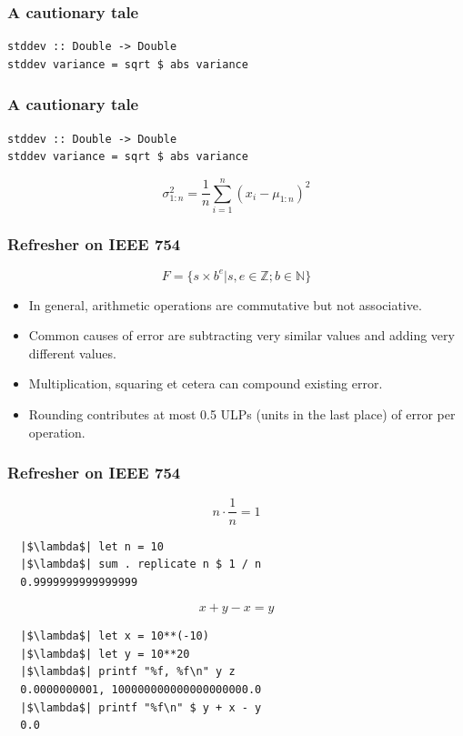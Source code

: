 \documentclass{beamer}
\begin{document}
\begin{frame}[fragile]
\frametitle{A cautionary tale}

\begin{verbatim}
stddev :: Double -> Double
stddev variance = sqrt $ abs variance
\end{verbatim}

\end{frame}

\begin{frame}[fragile]
\frametitle{A cautionary tale}

\begin{verbatim}
stddev :: Double -> Double
stddev variance = sqrt $ abs variance
\end{verbatim}

\[\sigma_{1:n}^2 = \frac{1}{n} \sum\limits_{i=1}^n (x_i - \mu_{1:n})^2\]

\end{frame}

\begin{frame}[fragile]

\frametitle{Refresher on IEEE 754}
  
\[F = \{s \times b^e | s, e \in \mathbb{Z}; b \in \mathbb{N} \}\]

\begin{itemize}
\item In general, arithmetic operations are commutative but not associative.
\item Common causes of error are subtracting very similar values and
  adding very different values.
\item Multiplication, squaring et cetera can compound existing error.
\item Rounding contributes at most 0.5 ULPs (units in the last place)
  of error per operation.
\end{itemize}

\end{frame}

\begin{frame}[fragile]

\frametitle{Refresher on IEEE 754}

\[ n \cdot \frac{1}{n} = 1 \]

\begin{verbatim}
  |$\lambda$| let n = 10
  |$\lambda$| sum . replicate n $ 1 / n
  0.9999999999999999
\end{verbatim}

\[ x + y - x = y \]

\begin{verbatim}
  |$\lambda$| let x = 10**(-10)
  |$\lambda$| let y = 10**20
  |$\lambda$| printf "%f, %f\n" y z
  0.0000000001, 100000000000000000000.0
  |$\lambda$| printf "%f\n" $ y + x - y
  0.0
\end{verbatim}

\end{frame}  
\end{document}

